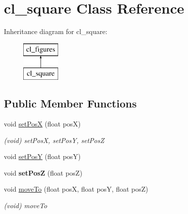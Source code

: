 \hypertarget{classcl__square}{}\section{cl\+\_\+square Class Reference}
\label{classcl__square}
Inheritance diagram for cl\+\_\+square\+:\begin{figure}[H]
\begin{center}
\leavevmode
\includegraphics[height=2.000000cm]{classcl__square}
\end{center}
\end{figure}
\subsection*{Public Member Functions}
{\bf }\par
\begin{DoxyCompactItemize}
\item 
void \hyperlink{classcl__figures_af1c498c43e5f302f9701f99d4407e6f0}{set\+Pos\+X} (float pos\+X)
\begin{DoxyCompactList}\small\item\em (void) set\+Pos\+X, set\+Pos\+Y, set\+Pos\+Z \end{DoxyCompactList}\item 
void \hyperlink{classcl__figures_ae07156aefb81f1a9b460e743f8f8c410}{set\+Pos\+Y} (float pos\+Y)
\item 
\hypertarget{classcl__figures_aaf722642edb1bd71e56e5005ad509182}{}void {\bfseries set\+Pos\+Z} (float pos\+Z)\label{classcl__figures_aaf722642edb1bd71e56e5005ad509182}

\end{DoxyCompactItemize}

{\bf }\par
\begin{DoxyCompactItemize}
\item 
void \hyperlink{classcl__figures_a00276ccac945306e2c65c0dcc7a7f558}{move\+To} (float pos\+X, float pos\+Y, float pos\+Z)
\begin{DoxyCompactList}\small\item\em (void) move\+To \end{DoxyCompactList}\end{DoxyCompactItemize}

